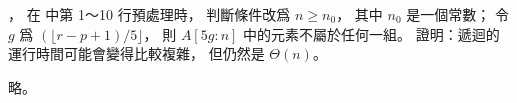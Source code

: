 \startEXERCISE，
在  中第 1～10 行預處理時，
判斷條件改爲 $n\ge n_0$，
其中 $n_0$ 是一個常數；
令 $g$ 爲 $(\lfloor r-p+1)/5\rfloor$，
則 $A[5g:n]$ 中的元素不屬於任何一組。
證明：遞迴的運行時間可能會變得比較複雜，
但仍然是 $\Theta(n)$。
\stopEXERCISE

\startANSWER
略。
\stopANSWER
